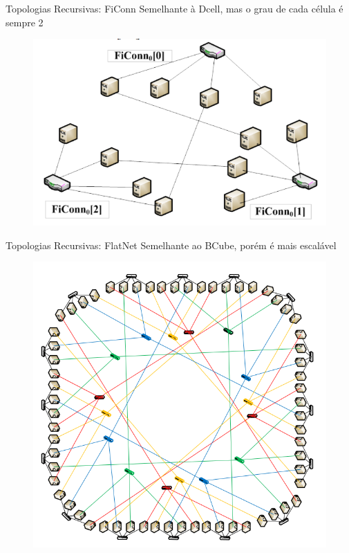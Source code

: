 \documentclass[aspectratio=169]{beamer}
\begin{document}
		\begin{frame} {Topologias Recursivas: FiConn}
			Semelhante à Dcell, mas o grau de cada célula é sempre 2
			\begin{figure}[ht]    
				\includegraphics[scale=0.3]{imagens/ficonn.png}
				\label{fig:sample_figure}
			\end{figure}
		\end{frame}

		\begin{frame} {Topologias Recursivas: FlatNet}
			Semelhante ao BCube, porém é mais escalável
			\begin{figure}[ht]    
				\includegraphics[scale=0.3]{imagens/flatnet.png}
				\label{fig:sample_figure}
			\end{figure}
		\end{frame}
\end{document}

